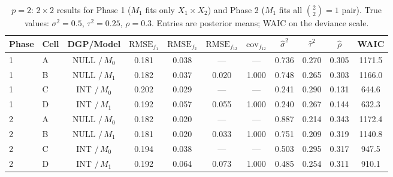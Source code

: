 \begin{table}[!ht]
\centering
\small
\caption{$p=2$: $2\times 2$ results for Phase 1 ($M_1$ fits only $X_1\times X_2$) and
Phase 2 ($M_1$ fits all $\binom{2}{2}=1$ pair). True values: $\sigma^2=0.5$,
$\tau^2=0.25$, $\rho=0.3$. Entries are posterior means; WAIC on the deviance scale.}
\label{tab:int_p2}
\begin{tabular}{llccccccccc}
\toprule
Phase & Cell & DGP/Model & $\mathrm{RMSE}_{f_1}$ & $\mathrm{RMSE}_{f_2}$ &
$\mathrm{RMSE}_{f_{12}}$ & $\mathrm{cov}_{f_{12}}$ &
$\hat\sigma^2$ & $\hat\tau^2$ & $\hat\rho$ & WAIC \\
\midrule
1 & A & NULL $/\,M_0$ & 0.181 & 0.038 & ---   & ---   & 0.736 & 0.270 & 0.305 & 1171.5 \\
1 & B & NULL $/\,M_1$ & 0.182 & 0.037 & 0.020 & 1.000 & 0.748 & 0.265 & 0.303 & 1166.0 \\
1 & C & INT $/\,M_0$  & 0.202 & 0.029 & ---   & ---   & 0.241 & 0.290 & 0.131 &  644.6 \\
1 & D & INT $/\,M_1$  & 0.192 & 0.057 & 0.055 & 1.000 & 0.240 & 0.267 & 0.144 &  632.3 \\
\midrule
2 & A & NULL $/\,M_0$ & 0.182 & 0.020 & ---   & ---   & 0.887 & 0.214 & 0.343 & 1172.4 \\
2 & B & NULL $/\,M_1$ & 0.181 & 0.020 & 0.033 & 1.000 & 0.751 & 0.209 & 0.319 & 1140.8 \\
2 & C & INT $/\,M_0$  & 0.194 & 0.038 & ---   & ---   & 0.503 & 0.295 & 0.317 &  947.5 \\
2 & D & INT $/\,M_1$  & 0.192 & 0.064 & 0.073 & 1.000 & 0.485 & 0.254 & 0.311 &  910.1 \\
\bottomrule
\end{tabular}
\end{table}

